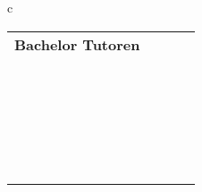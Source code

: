   \begin{tabular}{c}
\begin{tabular}{lll}
  { \textbf{Bachelor Tutoren}} \ \\ 
{
\npicture[0.3\linewidth]
{bilder/tutoren/dominik_pass}
{Dominik\\%
\randomize{d.schuermann@tu-bs.de}}
}%
& \ 
{\npicture[0.3\linewidth]
{bilder/tutoren/jan_germann.jpg}
{Jan\\%
\randomize{j.germann@tu-bs.de}}
} 
&\
{
\npicture[0.3\linewidth]
{bilder/tutoren/hf}
{Hella\\%
\randomize{h-f.hoffmann@tu-bs.de}}}
\\ \  \\
{\npicture[0.3\linewidth]
{bilder/tutoren/johannes.jpg}
{Johannes\\%
\randomize{J.Starosta@tu-bs.de}}
}& \ 
 {
 \npicture[0.3\linewidth]
 {bilder/tutoren/sebastian.jpeg}
 {Sebastian\\ %
\randomize{se.busse@tu-bs.de}}} 

\end{tabular}
\end{tabular}
